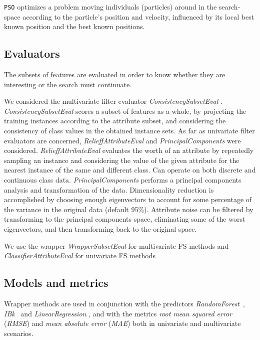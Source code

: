 \documentclass[journal,twoside,web]{ieeecolor}
\newcommand{\code}[1]{\colorbox{light-gray}{\texttt{#1}}}
\begin{document}
\code{PSO} optimizes a problem moving individuals (particles) around in the search-space according to the particle's position and velocity, influenced by its local best known position and the best known positions.


\subsection{Evaluators}

The subsets of features are evaluated in order to know whether they are interesting or the search must continuate.
	
	We considered the  multivariate filter evaluator   \emph{ConsistencySubsetEval} \cite{liu1996probabilistic}.  \emph{ConsistencySubsetEval}  sco\-res a subset of features as a whole, by projecting the training instances according to the attribute subset, and considering the consistency of class values in the obtained instance sets. As far as univariate filter evaluators are concerned, \textit{RelieffAttributeEval} \cite{Kira:1992:PAF:141975.142034} and \textit{PrincipalComponents} \cite{WICS:WICS101}  were considered. \textit{RelieffAttributeEval} evaluates the worth of an attribute by repeatedly sampling an instance and considering the value of the given attribute for the nearest instance of the same and different class. Can operate on both discrete and continuous class data. \textit{PrincipalComponents} performs a principal components analysis and transformation of the data.  Dimensionality reduction is accomplished by choosing enough eigenvectors to account for some percentage of the variance in the original data (default 95\%). Attribute noise can be filtered by transforming to the principal components space, eliminating some of the worst eigenvectors, and then transforming back to the original space.
		
	We use the wrapper \textit{WrapperSubsetEval}  \cite{kohavi1997wrappers} for multivariate FS methods and \textit{ClassifierAttributeEval} \cite{Schaefer2016b} for univariate FS methods 
	
\subsection{Models and metrics}

Wrapper methods are used in conjunction with the predictors \emph{RandomForest}~\cite{breiman2001random}, \emph{IBk}~\cite{Aha:1991:ILA:104713.104717} and \textit{LinearRegression} \cite{yan2009linear}, and with the metrics \emph{root mean squared error} (\textit{RMSE}) and \textit{mean absolute error} (\textit{MAE}) \cite{Willmott200579} both in univariate and multivariate scenarios. 
\end{document}
